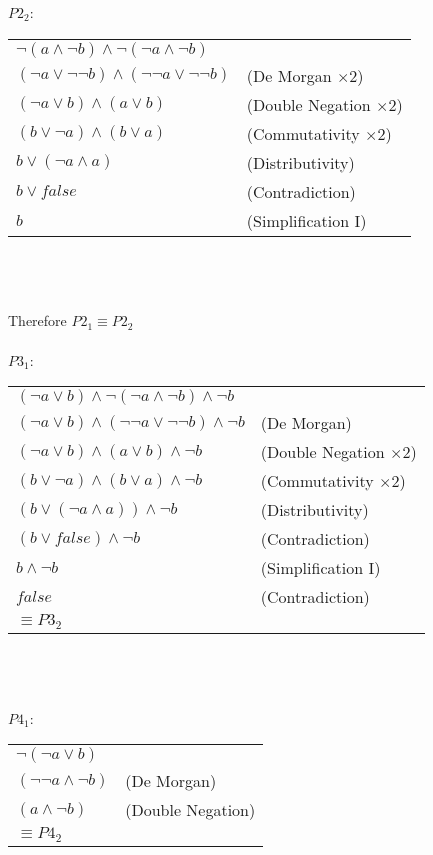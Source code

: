 \documentclass{article}[12pt]
\begin{document}
$P2_{2}$: \\
\begin{tabular}{ll}
  $\lnot(a \land \lnot b) \land \lnot (\lnot a \land \lnot b)$ \\
  $(\lnot a \lor \lnot \lnot b) \land (\lnot \lnot a \lor \lnot \lnot b)$ & (De Morgan $\times$2) \\
  $(\lnot a \lor b) \land (a \lor b)$ & (Double Negation $\times$2) \\
  $(b \lor \lnot a) \land (b \lor a)$ & (Commutativity $\times$2) \\
  $b \lor (\lnot a \land a)$ & (Distributivity) \\
  $b \lor false$ & (Contradiction) \\
  $b$ & (Simplification I) \\
\end{tabular} \\ \\ \\
  Therefore $P2_{1} \equiv P2_{2}$ \\ \\
$P3_{1}$: \\
\begin{tabular}{ll}
  $(\lnot a \lor b) \land \lnot (\lnot a \land \lnot b) \land \lnot b$ \\
  $(\lnot a \lor b) \land (\lnot \lnot a \lor \lnot \lnot b) \land \lnot b$ & (De Morgan) \\
  $(\lnot a \lor b) \land (a \lor b) \land  \lnot b$ & (Double Negation $\times$2) \\
  $(b \lor \lnot a) \land (b \lor a) \land \lnot b$ & (Commutativity $\times$2) \\
  $(b \lor (\lnot a \land a)) \land \lnot b$ & (Distributivity) \\
  $(b \lor false) \land \lnot b$ & (Contradiction) \\
  $b \land \lnot b$ & (Simplification I) \\
  $false$ & (Contradiction) \\
  $\equiv P3_{2}$ \\
\end{tabular} \\ \\ \\
$P4_{1}$: \\
\begin{tabular}{ll}
  $\lnot(\lnot a \lor b)$ \\
  $(\lnot \lnot a \land \lnot b)$ & (De Morgan) \\
  $(a \land \lnot b)$ & (Double Negation) \\
  $\equiv P4_{2}$ \\
\end{tabular} \\ \\ \\
\end{document}
